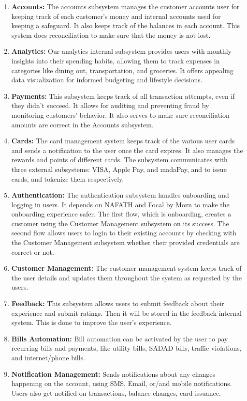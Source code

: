 \documentclass[a4paper]{report}
\begin{document}
\begin{enumerate}
    \item \textbf{Accounts:} The accounts subsystem manages the customer accounts user for keeping track of each customer’s money and internal accounts used for keeping a safeguard. It also keeps track of the balances in each account. This system does reconciliation to make sure that the money is not lost.
    \item \textbf{Analytics:} Our analytics internal subsystem provides users with monthly insights into their spending habits, allowing them to track expenses in categories like dining out, transportation, and groceries. It offers appealing data visualization for informed budgeting and lifestyle decisions.
    \item \textbf{Payments:} This subsystem keeps track of all transaction attempts, even if they didn’t succeed. It allows for auditing and preventing fraud by monitoring customers’ behavior. It also serves to make sure reconciliation amounts are correct in the Accounts subsystem.
    \item \textbf{Cards:} The card management system keeps track of the various user cards and sends a notification to the user once the card expires. It also manages the rewards and points of different cards. The subsystem communicates with three external subsystems: VISA, Apple Pay, and madaPay, and to issue cards, and tokenize them respectively.
    \item \textbf{Authentication:} The authentication subsystem handles onboarding and logging in users. It depends on NAFATH and Focal by Mozn to make the onboarding experience safer. The first flow, which is onboarding, creates a customer using the Customer Management subsystem on its success. The second flow allows users to login to their existing accounts by checking with the Customer Management subsystem whether their provided credentials are correct or not.
    \item \textbf{Customer Management:} The customer management system keeps track of the user details and updates them throughout the system as requested by the users.
    \item \textbf{Feedback:} This subsystem allows users to submit feedback about their experience and submit ratings. Then it will be stored in the feedback internal system. This is done to improve the user's experience.
    \item \textbf{Bills Automation:} Bill automation can be activated by the user to pay recurring bills and payments, like utility bills, SADAD bills, traffic violations, and internet/phone bills.
    \item \textbf{Notification Management:} Sends notifications about any changes happening on the account, using SMS, Email, or/and mobile notifications. Users also get notified on transactions, balance changes, card issuance.
\end{enumerate}
\end{document}
